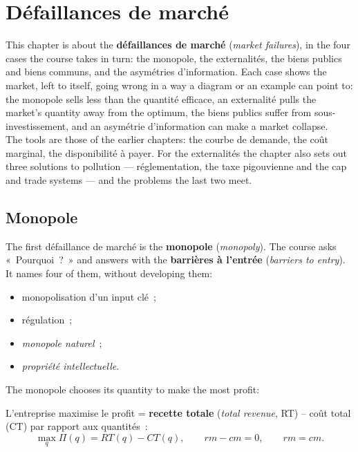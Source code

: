 \section{Défaillances de marché}

This chapter is about the \textbf{défaillances de marché} (\textit{market
failures}), in the four cases the course takes in turn: the monopole, the
externalités, the biens publics and biens communs, and the asymétries
d'information. Each case shows the market, left to itself, going wrong in a way a
diagram or an example can point to: the monopole sells less than the quantité
efficace, an externalité pulls the market's quantity away from the optimum, the
biens publics suffer from sous-investissement, and an asymétrie d'information can
make a market collapse.\\

The tools are those of the earlier chapters: the courbe de demande, the coût
marginal, the disponibilité à payer. For the externalités the chapter also sets
out three solutions to pollution --- réglementation, the taxe pigouvienne and the
cap and trade systems --- and the problems the last two meet.

\subsection{Monopole}

The first défaillance de marché is the \textbf{monopole} (\textit{monopoly}). The
course asks «~Pourquoi~?~» and answers with the \textbf{barrières à l'entrée}
(\textit{barriers to entry}). It names four of them, without developing them:
\begin{itemize}
  \item monopolisation d'un input clé~;
  \item régulation~;
  \item \emph{monopole naturel}~;
  \item \emph{propriété intellectuelle}.
\end{itemize}

The monopole chooses its quantity to make the most profit:

\begin{definition}
  L'entreprise maximise le profit = \textbf{recette totale}
  (\textit{total revenue}, RT) -- coût total (CT) par rapport aux quantités~:
  \[
    \max_q \Pi(q) = RT(q) - CT(q), \qquad rm - cm = 0, \qquad rm = cm.
  \]
\end{definition}

